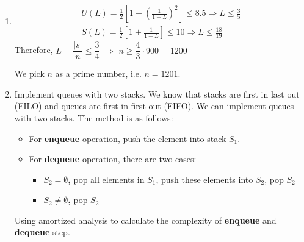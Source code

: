 \documentclass[12pt,a4paper]{article}
\makeatletter
\newtheorem*{solution}{Solution}
\theoremstyle{definition}
\renewenvironment{solution}[1][Solution] {\par\pushQED{\qed}\normalfont\topsep6\p@\@plus6\p@\relax\trivlist\item[\hskip\labelsep\bfseries#1\@addpunct{.}]\ignorespaces}{\popQED\endtrivlist\@endpefalse} \makeatother
\makeatother
\begin{document}
\begin{enumerate}
\begin{solution}
	$$
	\begin{array}{l}{U(L)=\frac{1}{2}\left[1+\left(\frac{1}{1-L}\right)^{2}\right] \leq 8.5 \Rightarrow L \leq \frac{3}{5}} \\ 
	{S(L)=\frac{1}{2}\left[1+\frac{1}{1-L}\right] \leq 10 \Rightarrow L \leq \frac{18}{19}}\end{array}
	$$
	Therefore, $L  = \dfrac{|s|}{n}\leq \dfrac{3}{4}$ $\Rightarrow$ $n \geq \dfrac{4}{3} \cdot 900 = 1200$
	
	We pick $n$ as a prime number, i.e. $n = 1201$.
	
\end{solution}


\item Implement queues with two stacks. We know that stacks are first in last out (FILO) and queues are first in first out (FIFO). We can implement queues with two stacks. The method is as follows:
	\begin{itemize}
		\item{For \textbf{enqueue} operation,} push the element into stack $S_1$.
		\item{For \textbf{dequeue} operation,} there are two cases:
		\begin{itemize}
			\item \textbf{$S_2 = \emptyset$,} pop all elements in $S_1$, push these elements into $S_2$, pop $S_2$
			\item \textbf{$S_2 \neq \emptyset$,} pop $S_2$
		\end{itemize}
	\end{itemize}
	Using amortized analysis to calculate the complexity of \textbf{enqueue} and \textbf{dequeue} step.


\end{enumerate}
\end{document}
